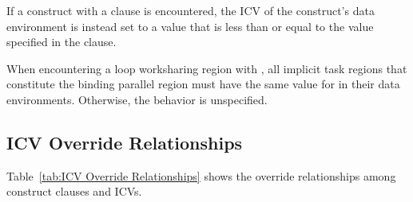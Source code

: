 If a  construct with a  clause is encountered,
the  ICV of the construct's data environment is instead set to a value that is less than or equal to the value specified in the clause.

When encountering a loop worksharing region with , all
implicit task regions that constitute the binding parallel region must have the same value
for  in their data environments. Otherwise, the behavior is unspecified.








\subsection{ICV Override Relationships}
\label{subsec:ICV Override Relationships}
Table~\ref{tab:ICV Override Relationships} shows the override relationships
among construct clauses and ICVs.

